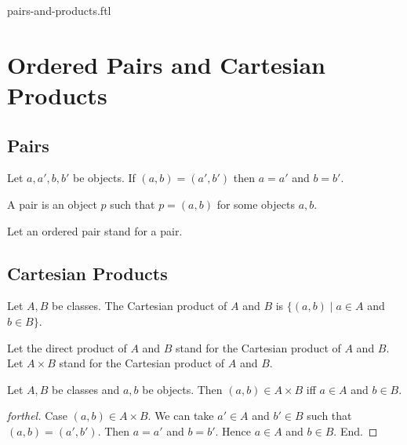 \documentclass{naproche-library}
\begin{document}
\begin{smodule}{pairs-and-products.ftl}

  \section*{Ordered Pairs and Cartesian Products}

  \subsection*{Pairs}

  \begin{axiom}[forthel,id=FOUNDATIONS_04_8464577431863296]
    Let $a, a', b, b'$ be objects.
    If $(a, b) = (a', b')$ then $a = a'$ and $b = b'$.
  \end{axiom}

  \begin{definition}[forthel,id=FOUNDATIONS_04_4782386822774784]
    A pair is an object $p$ such that $p = (a, b)$ for some objects $a, b$.

    Let an ordered pair stand for a pair.
  \end{definition}


  \subsection*{Cartesian Products}

  \begin{definition}[forthel,id=FOUNDATIONS_04_2877806274936832]
    Let $A, B$ be classes.
    The Cartesian product of $A$ and $B$ is $\{ (a, b) \mid a \in A$ and $b \in B \}$.

    Let the direct product of $A$ and $B$ stand for  the Cartesian product of $A$ and $B$.
    Let $A \times B$ stand for the Cartesian product of $A$ and $B$.
  \end{definition}

  \begin{proposition}[forthel,id=FOUNDATIONS_04_1581118511906816]
    Let $A, B$ be classes and $a, b$ be objects.
    Then $(a, b) \in A \times B$ iff $a \in A$ and $b \in B$.
  \end{proposition}
  \begin{proof}[forthel]
    Case $(a, b) \in A \times B$.
      We can take $a' \in A$ and $b' \in B$ such that $(a, b) = (a', b')$.
      Then $a = a'$ and $b = b'$.
      Hence $a \in A$ and $b \in B$.
    End.


\end{proof}
\end{smodule}
\end{document}
